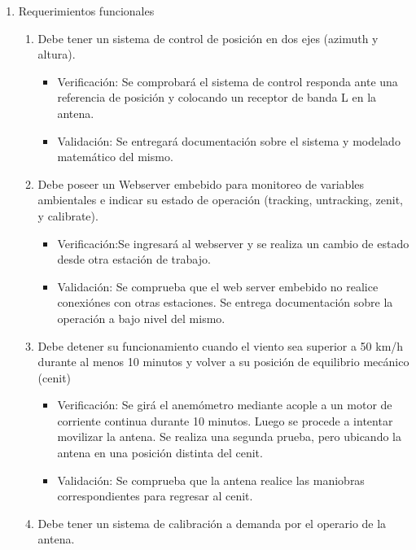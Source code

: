 \documentclass[11pt, %
codirector, %
]{charter}
\begin{document}
\begin{enumerate}
\item Requerimientos funcionales 
	\begin{enumerate}
		\item Debe tener un sistema de control de posición en dos ejes (azimuth y altura).
				\begin{itemize}
					\item Verificación: Se comprobará el sistema de control responda ante una referencia de posición y colocando un receptor de banda L en la antena. 
					\item Validación: Se entregará documentación sobre el sistema y modelado matemático del mismo. 
				\end{itemize} 
		
		\item Debe poseer un Webserver embebido para monitoreo de variables ambientales e indicar su estado de operación (tracking, untracking, zenit, y calibrate). 
			\begin{itemize}
				\item Verificación:Se ingresará al webserver y se realiza un cambio de estado desde otra estación de trabajo. 
				\item Validación: Se comprueba que el web server embebido no realice conexiónes con otras estaciones. Se entrega documentación sobre la operación a bajo nivel del mismo.  
			\end{itemize} 
		\setcounter{enumii}{4}	
		\item Debe detener su funcionamiento cuando el viento sea superior a 50 km/h durante al menos 10 minutos y volver a su posición de equilibrio mecánico (cenit) 
			\begin{itemize}
				\item Verificación: Se girá el anemómetro mediante acople a un motor de corriente continua durante 10 minutos. Luego se procede a intentar movilizar la antena. Se realiza una segunda prueba, pero ubicando la antena en una posición distinta del cenit. 
				\item Validación: Se comprueba que la antena realice las maniobras correspondientes para regresar al cenit. 
			\end{itemize} 
		\item Debe tener un sistema de calibración a demanda por el operario de la antena. 

\end{enumerate}
\end{enumerate}
\end{document}
